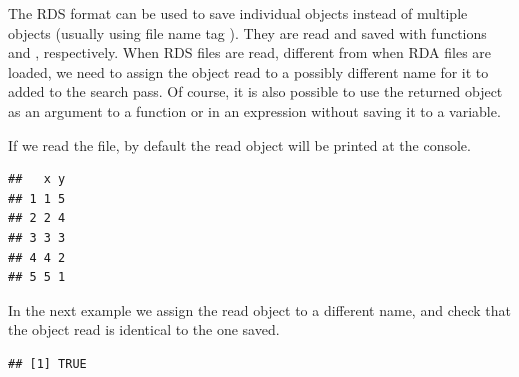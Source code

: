 \documentclass[krantz2]{krantz}\usepackage{knitr}
\begin{document}
The RDS format can be used to save individual objects instead of multiple objects (usually using file name tag ). They are read and saved with functions  and , respectively.
When RDS files are read, different from when RDA files are loaded, we need to assign the object read to a possibly different name for it to added to the search pass. Of course, it is also possible to use the returned object as an argument to a function or in an expression without saving it to a variable.

\begin{knitrout}\footnotesize
{}\color{fgcolor}\begin{kframe}
\begin{alltt}
 \hlstd{)}
\end{alltt}
\end{kframe}
\end{knitrout}

If we read the file, by default the read \Rlang object will be printed at the console.

\begin{knitrout}\footnotesize
{}\color{fgcolor}\begin{kframe}
\begin{alltt}
\hlstd{(}\hlstd{)}
\end{alltt}
\begin{verbatim}
##   x y
## 1 1 5
## 2 2 4
## 3 3 3
## 4 4 2
## 5 5 1
\end{verbatim}
\end{kframe}
\end{knitrout}

In the next example we assign the read object to a different name, and check that the object read is identical to the one saved.

\begin{knitrout}\footnotesize
{}\color{fgcolor}\begin{kframe}
\begin{alltt}
 \hlkwb{<-} \hlstd{(}\hlstd{)}
\end{alltt}
\begin{verbatim}
## [1] TRUE
\end{verbatim}
\end{kframe}
\end{knitrout}
\end{document}
